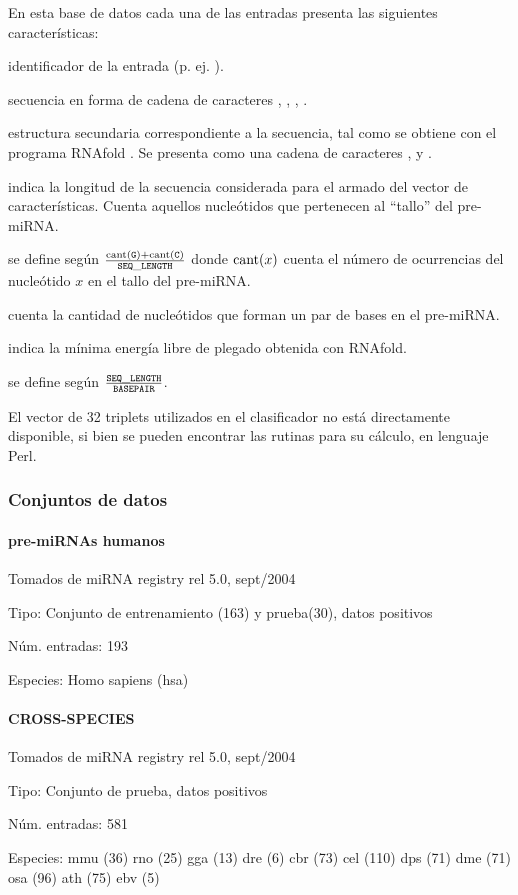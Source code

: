\documentclass[12pt,bibliography=oldstyle,DIV=12,parskip=half-]{scrartcl}
\begin{document}
En esta base de datos cada una de las entradas presenta las siguientes
características:
\begin{description*}
%
\item[identificador] de la entrada (p. ej. ).
%
\item[secuencia] en forma de cadena de caracteres , ,
  , .
%
\item[estructura secundaria] correspondiente a la secuencia, tal como
  se obtiene con el programa RNAfold \cite{vienna}. Se presenta como
  una cadena de caracteres \mono{(},  y \mono{)}.
%
\item[\mono{SEQ\_LENGTH}] indica la longitud de la secuencia
  considerada para el armado del vector de características. Cuenta
  aquellos nucleótidos que pertenecen al ``tallo'' del pre-miRNA.
%
\item[\mono{GC\_CONTENT}] se define según
  $\frac{\textrm{cant}({\tt G})+\textrm{cant}({\tt C})}{{\tt SEQ\_LENGTH}}$
  donde $\textrm{cant}(x)$ cuenta el número de ocurrencias del nucleótido
  $x$ en el tallo del pre-miRNA.
%
\item[\mono{BASEPAIR}] cuenta la cantidad de nucleótidos
  que forman un par de bases en el pre-miRNA.
%
\item[\mono{FREE\_ENERGY}] indica la mínima energía libre de plegado
  obtenida con RNAfold.
%
\item[\mono{LEN\_BP\_RATIO}] se define según
  $\frac{{\tt SEQ\_LENGTH}}{{\tt BASEPAIR}}$.
\end{description*}
%
El vector de 32 triplets utilizados en el clasificador no está
directamente disponible, si bien se pueden encontrar las rutinas para su
cálculo, en lenguaje Perl.
%
\subsubsection{Conjuntos de datos}
\paragraph{pre-miRNAs humanos}
Tomados de miRNA registry rel 5.0, sept/2004
\begin{description*}
\item[Tipo:] Conjunto de entrenamiento (163) y prueba(30), datos
  positivos
\item[Núm. entradas:] 193
\item[Especies:] Homo sapiens (hsa)
\end{description*}
\paragraph{CROSS-SPECIES}
Tomados de miRNA registry rel 5.0, sept/2004
\begin{description*}
\item[Tipo:] Conjunto de prueba, datos positivos
\item[Núm. entradas:] 581
\item[Especies:]
  \quad mmu (36)
  \quad rno (25)
  \quad gga (13)
  \quad dre (6)
  \quad cbr (73)
  \quad cel (110)
  \quad dps (71)
  \quad dme (71)
  \quad osa (96)
  \quad ath (75)
  \quad ebv (5)
\end{description*}
%
\end{document}
